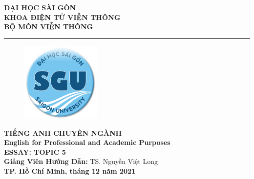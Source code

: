 \begin{titlepage}
    \begin{center}
        \vspace{6pt}
        \textbf{
            \fontsize{14pt}{0pt} 
            \selectfont ĐẠI HỌC SÀI GÒN\\
            \selectfont KHOA ĐIỆN TỬ VIỄN THÔNG\\
            \selectfont BỘ MÔN VIỄN THÔNG\\
        }
        
        \vspace{15pt}
        \rule{200pt}{0.6pt}

        \vspace{10pt}
        \begin{figure}[H]
            \centering
            \includegraphics[height = 4cm, width = 4cm]{img/sgu-logo.png}
        \end{figure}

        \vspace{10pt}
        \textbf{
            \fontsize{20pt}{0pt} 
            \selectfont TIẾNG ANH CHUYÊN NGÀNH\\
            \vspace{20pt}
            \selectfont English for Professional and Academic Purposes\\
            \vspace{20pt}
            \fontsize{24pt}{0pt}
            \selectfont ESSAY: TOPIC 5\\
            \vspace{35pt}
            \fontsize{16pt}{0pt}
            \selectfont Giảng Viên Hướng Dẫn: 
        }
        \fontsize{16pt}{0pt} \selectfont TS. Nguyễn Việt Long\\
        \vspace{10cm}
        \textbf{
            \fontsize{16pt}{0pt}
            \selectfont TP. Hồ Chí Minh, tháng 12 năm 2021
        }
    \end{center}
\end{titlepage}